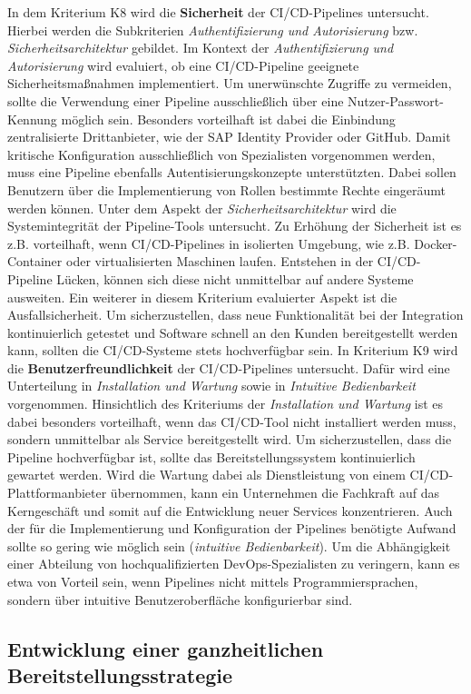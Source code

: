 In dem Kriterium K8 wird die \textbf{Sicherheit} der CI/CD-Pipelines untersucht. Hierbei werden die Subkriterien \textit{Authentifizierung und Autorisierung} bzw. \textit{Sicherheitsarchitektur} gebildet. Im Kontext der \textit{Authentifizierung und Autorisierung} wird evaluiert, ob eine CI/CD-Pipeline geeignete Sicherheitsmaßnahmen implementiert. Um unerwünschte Zugriffe zu vermeiden, sollte die Verwendung einer Pipeline ausschließlich über eine Nutzer-Passwort-Kennung möglich sein. Besonders vorteilhaft ist dabei die Einbindung zentralisierte Drittanbieter, wie der SAP Identity Provider oder GitHub. Damit kritische Konfiguration ausschließlich von Spezialisten vorgenommen werden, muss eine Pipeline ebenfalls Autentisierungskonzepte unterstützten. Dabei sollen Benutzern über die Implementierung von Rollen bestimmte Rechte eingeräumt werden können. Unter dem Aspekt der \textit{Sicherheitsarchitektur} wird die Systemintegrität der Pipeline-Tools untersucht. Zu Erhöhung der Sicherheit ist es z.B. vorteilhaft, wenn CI/CD-Pipelines in isolierten Umgebung, wie z.B. Docker-Container oder virtualisierten Maschinen laufen. Entstehen in der CI/CD-Pipeline Lücken, können sich diese nicht unmittelbar auf andere Systeme ausweiten. Ein weiterer in diesem Kriterium evaluierter Aspekt ist die Ausfallsicherheit. Um sicherzustellen, dass neue Funktionalität bei der Integration kontinuierlich getestet und Software schnell an den Kunden bereitgestellt werden kann, sollten die CI/CD-Systeme stets hochverfügbar sein.
In Kriterium K9 wird die \textbf{Benutzerfreundlichkeit} der CI/CD-Pipelines untersucht. Dafür wird eine Unterteilung in \textit{Installation und Wartung} sowie in \textit{Intuitive Bedienbarkeit} vorgenommen. Hinsichtlich des Kriteriums der \textit{Installation und Wartung} ist es dabei besonders vorteilhaft, wenn das CI/CD-Tool nicht installiert werden muss, sondern unmittelbar als Service bereitgestellt wird. Um sicherzustellen, dass die Pipeline hochverfügbar ist, sollte das Bereitstellungssystem kontinuierlich gewartet werden. Wird die Wartung dabei als Dienstleistung von einem CI/CD-Plattformanbieter übernommen, kann ein Unternehmen die Fachkraft auf das Kerngeschäft und somit auf die Entwicklung neuer Services konzentrieren. Auch der für die Implementierung und Konfiguration der Pipelines benötigte Aufwand sollte so gering wie möglich sein (\textit{intuitive Bedienbarkeit}). Um die Abhängigkeit einer Abteilung von hochqualifizierten DevOps-Spezialisten zu veringern, kann es etwa von Vorteil sein, wenn Pipelines nicht mittels Programmiersprachen, sondern über intuitive Benutzeroberfläche konfigurierbar sind.  
\subsection{Entwicklung einer ganzheitlichen Bereitstellungsstrategie}
 